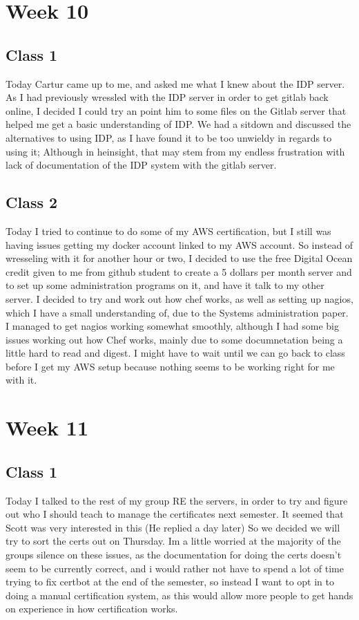 \documentclass{article}
\begin{document}
\section{Week 10}
\subsection{Class 1}
Today Cartur came up to me, and asked me what I knew about the IDP server. As I had previously wressled with the IDP server in order to get
gitlab back online, I decided I could try an point him to some files on the Gitlab server that helped me get a basic understanding of IDP. We had 
a sitdown and discussed the alternatives to using IDP, as I have found it to be too unwieldy in regards to using it; Although in heinsight, that
may stem from my endless frustration with lack of documentation of the IDP system with the gitlab server.
\subsection{Class 2}
Today I tried to continue to do some of my AWS certification, but I still was having issues getting my docker account linked to my AWS account. So instead
of wresseling with it for another hour or two, I decided to use the free Digital Ocean credit given to me from github student to create a 5 dollars per month server
and to set up some administration programs on it, and have it talk to my other server. I decided to try and work out how chef works, as well as setting up
nagios, which I have a small understanding of, due to the Systems administration paper. I managed to get nagios working somewhat smoothly, although I had some
big issues working out how Chef works, mainly due to some documnetation being a little hard to read and digest. I might have to wait until we can go back
to class before I get my AWS setup because nothing seems to be working right for me with it.

\section{Week 11}
\subsection{Class 1}
Today I talked to the rest of my group RE the servers, in order to try and figure out who I should teach to manage the certificates next semester. It seemed that
Scott was very interested in this (He replied a day later) So we decided we will try to sort the certs out on Thursday. Im a little worried at the majority of 
the groups silence on these issues, as the documentation for doing the certs doesn't seem to be currently correct, and i would rather not have to spend a lot of 
time trying to fix certbot at the end of the semester, so instead I want to opt in to doing a manual certification system, as this would allow more people to get 
hands on experience in how certification works.
\end{document}
